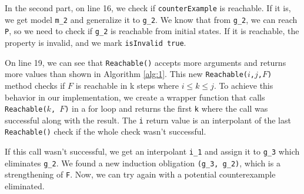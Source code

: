 In the second part, on line 16, we check if \texttt{counterExample} is reachable. If it is, we get model \texttt{m\_2} and generalize it to \texttt{g\_2}. We know that from \texttt{g\_2}, we can reach \texttt{\neg P}, so we need to check if \texttt{g\_2} is reachable from initial states. If it is reachable, the property is invalid, and we mark \texttt{isInvalid \gets true}.

On line 19, we can see that \texttt{Reachable()} accepts more arguments and returns more values than shown in Algorithm \ref{alg:1}. This new \texttt{Reachable($i$,$j$,$F$)} method checks if $F$ is reachable in k steps where $i\leq k \leq j$. To achieve this behavior in our implementation, we create a wrapper function that calls \texttt{Reachable($k$, $F$)} in a for loop and returns the first \texttt{k} where the call was successful along with the result. The \texttt{i} return value is an interpolant of the last \texttt{Reachable()} check if the whole check wasn't successful.

If this call wasn't successful, we get an interpolant \texttt{i\_1} and assign it to \texttt{g\_3} which eliminates \texttt{g\_2}. We found a new induction obligation \texttt{(g\_3, g\_2)}, which is a strengthening of \texttt{F}. Now, we can try again with a potential counterexample eliminated.

